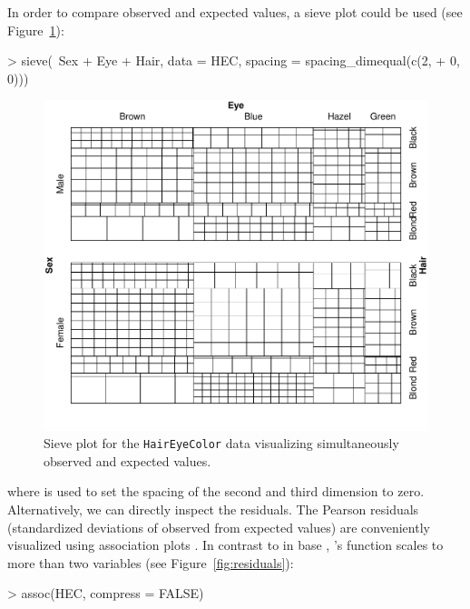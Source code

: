 \documentclass{Z}
\newcommand{\data}[1]{\texttt{#1}}
\newcommand{\codefun}[1]{\code{#1()}}
\begin{document}
\noindent In order to compare observed and expected values,
a sieve plot \citep{vcd:riedwyl+schuepbach:1994} 
could be used (see Figure~\ref{fig:sieve}):

\begin{Schunk}
\begin{Sinput}
> sieve(~Sex + Eye + Hair, data = HEC, spacing = spacing_dimequal(c(2, 
+     0, 0)))
\end{Sinput}
\end{Schunk}

\begin{figure}[h]
\begin{center}
\includegraphics{strucplot-sievefig}
\caption{Sieve plot for the \data{HairEyeColor} data visualizing simultaneously
  observed and expected values.}
\label{fig:sieve}
\end{center}
\end{figure}

\noindent where  is used to set the spacing
of the second and third dimension to zero. Alternatively, we can directly inspect the residuals. 
The Pearson residuals (standardized deviations of observed from expected values) 
are conveniently visualized using association
plots \citep{vcd:Cohen:1980}. In contrast to \codefun{assocplot} in
base , 's \codefun{assoc}
function scales to more than two variables (see Figure~\ref{fig:residuals}):

\begin{Schunk}
\begin{Sinput}
> assoc(HEC, compress = FALSE)
\end{Sinput}
\end{Schunk}
\end{document}

